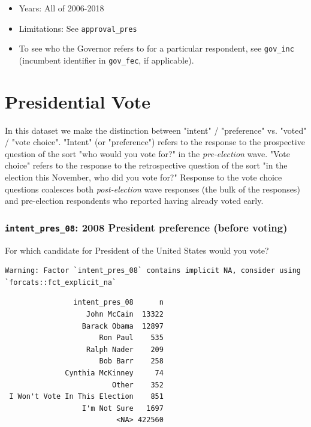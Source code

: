 \documentclass[10pt,article,oneside]{memoir}
\theoremstyle{definition}
\begin{document}
\begin{itemize}
\tightlist
\item
  Years: All of 2006-2018
\item
  Limitations: See \texttt{approval\_pres}
\item
  To see who the Governor refers to for a particular respondent, see
  \texttt{gov\_inc} (incumbent identifier in \texttt{gov\_fec}, if
  applicable).
\end{itemize}

\newpage

\hypertarget{presidential-vote}{%
\section{Presidential Vote}\label{presidential-vote}}

\begin{tcolorbox}[title={A note on \texttt{intent} and \texttt{voted}}]
In this dataset we make the distinction between "intent" / "preference" vs. "voted" / "vote choice". "Intent" (or "preference") refers to the response to the prospective question of the sort "who would you vote for?" in the \emph{pre-election} wave. "Vote choice" refers to the response to the retrospective question of the sort "in the election this November, who did you vote for?" Response to the vote choice questions coalesces both \emph{post-election} wave responses (the bulk of the responses) and pre-election respondents who reported having already voted early. 
\end{tcolorbox}

\hypertarget{intent_pres_08-2008-president-preference-before-voting}{%
\subsubsection{\texorpdfstring{\texttt{intent\_pres\_08}: 2008 President
preference (before
voting)}{intent\_pres\_08: 2008 President preference (before voting)}}\label{intent_pres_08-2008-president-preference-before-voting}}

For which candidate for President of the United States would you vote?

\begin{verbatim}
Warning: Factor `intent_pres_08` contains implicit NA, consider using
`forcats::fct_explicit_na`
\end{verbatim}

\begin{verbatim}
                intent_pres_08      n
                   John McCain  13322
                  Barack Obama  12897
                      Ron Paul    535
                   Ralph Nader    209
                      Bob Barr    258
              Cynthia McKinney     74
                         Other    352
 I Won't Vote In This Election    851
                  I'm Not Sure   1697
                          <NA> 422560
\end{verbatim}
\end{document}
